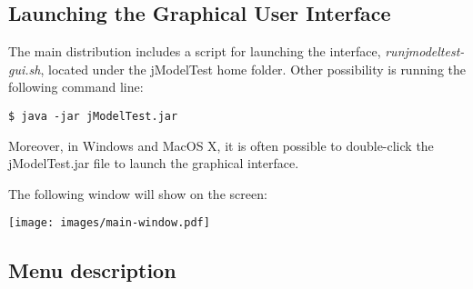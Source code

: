 \documentclass[10pt,twoside,a4paper]{article}
\begin{document}
\subsection{Launching the Graphical User Interface}

The main distribution includes a script for launching the interface,  \emph{runjmodeltest-gui.sh}, located under the jModelTest home folder. Other possibility is running the following command line:

\begin{lstlisting}
$ java -jar jModelTest.jar
\end{lstlisting}

Moreover, in Windows and MacOS X, it is often possible to double-click the jModelTest.jar file to launch the graphical interface.

The following window will show on the screen:

\begin{center}
\texttt{[image: images/main-window.pdf]}
\end{center}

\subsection{Menu description}
\end{document}
